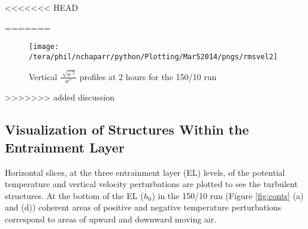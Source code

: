 
<<<<<<< HEAD

=======
\begin{figure}[htbp]
    \centering
    \texttt{[image: /tera/phil/nchaparr/python/Plotting/Mar52014/pngs/rmsvel2]}
    \caption{Vertical $\frac{\sqrt[]{u^{,2}}}{w^{*}}$ profiles at 2 hours for the 150/10 run}
    \label{fig:rmsvel150102hrs}   %
\end{figure}
>>>>>>> added discussion

\clearpage

\subsection{Visualization of Structures Within the Entrainment Layer}
\FloatBarrier

Horizontal slices, at the three entrainment layer (\acs{EL}) levels, of the potential temperature 
and vertical velocity perturbations are plotted to see the turbulent structures.  At the bottom of the \acs{EL} ($h_{0}$) 
in the 150/10 run (Figure \ref{fig:conts} (a) and (d)) coherent areas of positive and negative temperature perturbations 
correspond to areas of upward and downward moving air.\\

